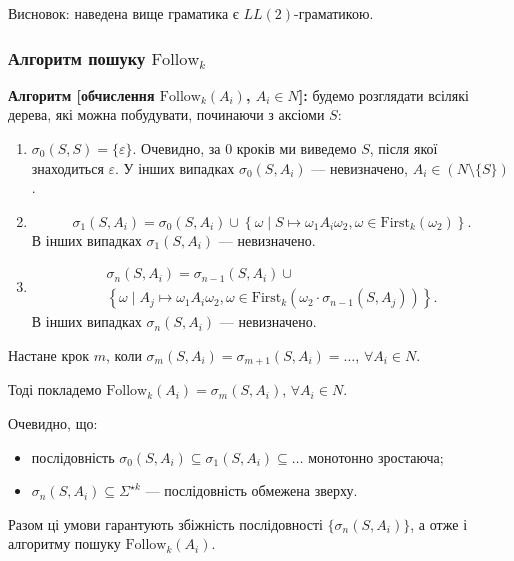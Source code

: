 Висновок: наведена вище граматика є $LL(2)$-граматикою.

\subsubsection{Алгоритм пошуку \texorpdfstring{$\text{Follow}_k$}{Followk}}

\textbf{Алгоритм [обчислення $\text{Follow}_k (A_i)$, $A_i \in N$]:} будемо розглядати всілякі дерева, які можна побудувати, починаючи з аксіоми $S$:
\begin{enumerate}
	\item $\sigma_0(S, S) = \{\varepsilon\}$. Очевидно, за 0 кроків ми виведемо $S$, після якої знаходиться $\varepsilon$. У інших випадках $\sigma_0(S, A_i)$ --- невизначено, $A_i \in (N \setminus \{S\})$.
	\item \begin{equation}
	    \sigma_1(S, A_i) = \sigma_0(S, A_i) \cup \left\{ \omega \mid S \mapsto \omega_1 A_i \omega_2, \omega \in \text{First}_k(\omega_2) \right\}.
	\end{equation}
	В інших випадках $\sigma_1(S, A_i)$ --- невизначено.
	\item \begin{multline}
	    \sigma_n(S, A_i) = \sigma_{n - 1}(S, A_i) \cup \\
	    \left\{ \omega \mid A_j \mapsto \omega_1 A_i \omega_2, \omega \in \text{First}_k(\omega_2 \cdot \sigma_{n - 1}(S, A_j)) \right\}.
	\end{multline}
	В інших випадках $\sigma_n(S, A_i)$ --- невизначено.
\end{enumerate}

Настане крок $m$, коли $\sigma_m(S, A_i) = \sigma_{m + 1}(S, A_i) = \ldots $, $\forall A_i \in N$. \medskip

Тоді покладемо $\text{Follow}_k(A_i) = \sigma_m(S, A_i)$, $\forall A_i \in N$. \medskip

Очевидно, що:
\begin{itemize}
	\item послідовність $\sigma_0(S, A_i) \subseteq \sigma_1(S, A_i) \subseteq \ldots$ монотонно зростаюча;
	\item $\sigma_n(S, A_i) \subseteq \Sigma^{\star k}$ --- послідовність обмежена зверху.
\end{itemize}

Разом ці умови гарантують збіжність послідовності $\{\sigma_n(S, A_i)\}$, а отже і алгоритму пошуку $\text{Follow}_k(A_i)$.


